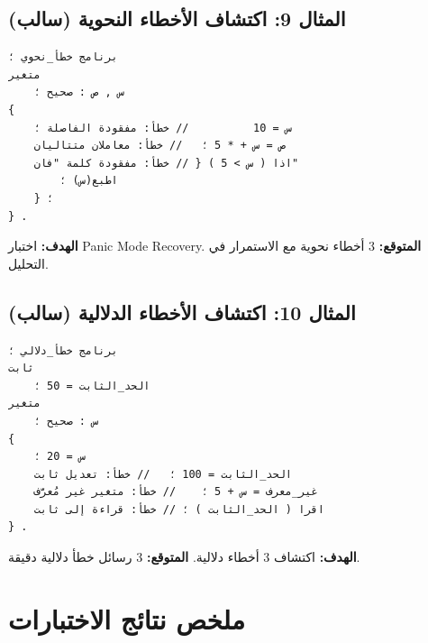 \documentclass[12pt,a4paper]{report}
\newcommand{\filename}[1]{\textcolor{SecondaryBlue}{\texttt{#1}}}
\begin{document}
\subsection{المثال 9: اكتشاف الأخطاء النحوية (سالب)}

\begin{CodeBox}[title={المثال 9 — \filename{09\_اختبار\_الاخطاء\_النحوية.arb}}]
\begin{lstlisting}[style=ArabicCodeStyle]
برنامج خطأ_نحوي ؛
متغير
    س , ص : صحيح ؛
{
    س = 10          // خطأ: مفقودة الفاصلة ؛
    ص = س + * 5 ؛   // خطأ: معاملان متتاليان
    اذا ( س > 5 ) { // خطأ: مفقودة كلمة "فان"
        اطبع(س) ؛
    } ؛
} .
\end{lstlisting}
\end{CodeBox}
\textbf{\arabicfont الهدف:} اختبار Panic Mode Recovery. \quad \textbf{\arabicfont المتوقع:} 3 أخطاء نحوية مع الاستمرار في التحليل.

\subsection{المثال 10: اكتشاف الأخطاء الدلالية (سالب)}

\begin{CodeBox}[title={المثال 10 — \filename{10\_اختبار\_الاخطاء\_الدلالية.arb}}]
\begin{lstlisting}[style=ArabicCodeStyle]
برنامج خطأ_دلالي ؛
ثابت
    الحد_الثابت = 50 ؛
متغير
    س : صحيح ؛
{
    س = 20 ؛
    الحد_الثابت = 100 ؛   // خطأ: تعديل ثابت
    غير_معرف = س + 5 ؛    // خطأ: متغير غير مُعرَّف
    اقرا ( الحد_الثابت ) ؛ // خطأ: قراءة إلى ثابت
} .
\end{lstlisting}
\end{CodeBox}
\textbf{\arabicfont الهدف:} اكتشاف 3 أخطاء دلالية. \quad \textbf{\arabicfont المتوقع:} 3 رسائل خطأ دلالية دقيقة.

\section{ملخص نتائج الاختبارات}
\end{document}
